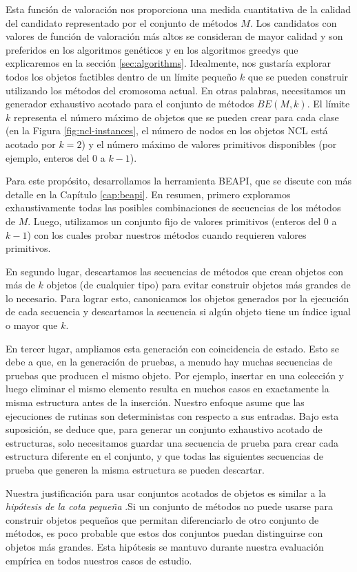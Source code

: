 Esta función de valoración nos proporciona una medida cuantitativa de la calidad del candidato representado por el conjunto de métodos $M$. Los candidatos con valores de función de valoración más altos se consideran de mayor calidad y son preferidos en los algoritmos genéticos y en los algoritmos greedys que explicaremos en la sección \ref{sec:algorithms}.
Idealmente, nos gustaría explorar todos los objetos factibles dentro de un límite pequeño $k$ que se pueden construir utilizando los métodos del cromosoma actual. En otras palabras, necesitamos un generador exhaustivo acotado para el conjunto de métodos $BE(M, k)$. El límite $k$ representa el número máximo de objetos que se pueden crear para cada clase (en la Figura \ref{fig:ncl-instances}, el número de nodos en los objetos NCL está acotado por $k=2$) y el número máximo de valores primitivos disponibles (por ejemplo, enteros del 0 a $k-1$).

Para este propósito, desarrollamos la herramienta BEAPI, que se discute con más detalle en la Capítulo \ref{cap:beapi}. En resumen, primero exploramos exhaustivamente todas las posibles combinaciones de secuencias de los métodos de $M$. Luego, utilizamos un conjunto fijo de valores primitivos (enteros del 0 a $k-1$) con los cuales probar nuestros métodos cuando requieren valores primitivos.

En segundo lugar, descartamos las secuencias de métodos que crean objetos con más de $k$ objetos (de cualquier tipo) para evitar construir objetos más grandes de lo necesario. Para lograr esto, canonicamos los objetos generados por la ejecución de cada secuencia y descartamos la secuencia si algún objeto tiene un índice igual o mayor que $k$.

En tercer lugar, ampliamos esta generación con coincidencia de estado. Esto se debe a que, en la generación de pruebas, a menudo hay muchas secuencias de pruebas que producen el mismo objeto. Por ejemplo, insertar en una colección y luego eliminar el mismo elemento resulta en muchos casos en exactamente la misma estructura antes de la inserción. Nuestro enfoque asume que las ejecuciones de rutinas son deterministas con respecto a sus entradas. Bajo esta suposición, se deduce que, para generar un conjunto exhaustivo acotado de estructuras, solo necesitamos guardar una secuencia de prueba para crear cada estructura diferente en el conjunto, y que todas las siguientes secuencias de prueba que generen la misma estructura se pueden descartar.

Nuestra justificación para usar conjuntos acotados de objetos es similar a la \emph{hipótesis de la cota pequeña} \cite{Andoni:2003}.Si un conjunto de métodos no puede usarse para construir objetos pequeños que permitan diferenciarlo de otro conjunto de métodos, es poco probable que estos dos conjuntos puedan distinguirse con objetos más grandes. Esta hipótesis se mantuvo durante nuestra evaluación empírica en todos nuestros casos de estudio.


